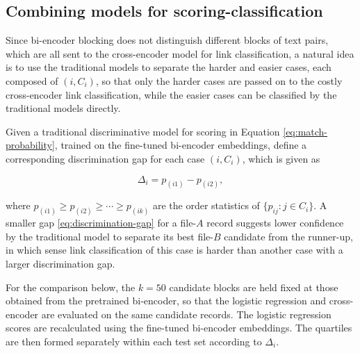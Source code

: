 \subsection{Combining models for scoring-classification}
\label{sec:combining-models}

Since bi-encoder blocking does not distinguish different blocks of text pairs, which are
all sent to the cross-encoder model for link classification, a natural idea is to use the
traditional models to separate the harder and easier cases, each composed of $(i,C_i)$,
so that only the harder cases are passed on to the costly cross-encoder link classification,
while the easier cases can be classified by the traditional models directly.

Given a traditional discriminative model for scoring in Equation
\eqref{eq:match-probability}, trained on the fine-tuned bi-encoder embeddings, define a
corresponding discrimination gap for each case $(i,C_i)$, which is given as

\begin{equation}
\label{eq:discrimination-gap}
\Delta_i = p_{(i1)} - p_{(i2)},
\end{equation}

where $p_{(i1)} \geq p_{(i2)} \geq \cdots \geq p_{(ik)}$ are the order statistics of
$\{p_{ij}:j\in C_i\}$. A smaller gap \eqref{eq:discrimination-gap} for a file-$A$
record suggests lower confidence by the traditional model to separate its best file-$B$
candidate from the runner-up, in which sense link classification of this case is harder
than another case with a larger discrimination gap.

For the comparison below, the $k=50$ candidate blocks are held fixed at those obtained
from the pretrained bi-encoder, so that the logistic regression and cross-encoder are
evaluated on the same candidate records. The logistic regression scores are recalculated
using the fine-tuned bi-encoder embeddings. The quartiles are then formed separately
within each test set according to $\Delta_i$. 

